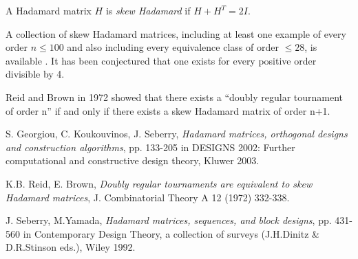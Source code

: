 \documentclass[12pt]{article}
\begin{document}

A Hadamard matrix $H$ is \emph{skew Hadamard} if $H+H^T=2I$.

A collection of skew Hadamard matrices, including at least one example of every order $n \le 100$
and also including every equivalence class of order $\le 28$, is available
.
It has been conjectured that one exists for every positive order divisible by 4.

Reid and Brown in 1972 showed that there exists a 
``doubly regular tournament of order n''
if and only if there exists a skew Hadamard matrix of order n+1.

\begin{thebibliography}{9}
S. Georgiou, C. Koukouvinos, J. Seberry, \emph{Hadamard matrices, orthogonal designs and construction algorithms}, pp. 133-205 in DESIGNS 2002: Further computational and constructive design theory, Kluwer 2003.

K.B. Reid, E. Brown, \emph{Doubly regular tournaments are equivalent to skew Hadamard matrices}, J. Combinatorial Theory A 12 (1972) 332-338.

J. Seberry, M.Yamada, \emph{Hadamard matrices, sequences, and block designs}, pp. 431-560 in Contemporary Design Theory, a collection of surveys (J.H.Dinitz \& D.R.Stinson eds.), Wiley 1992.

\end{thebibliography}
\end{document}
